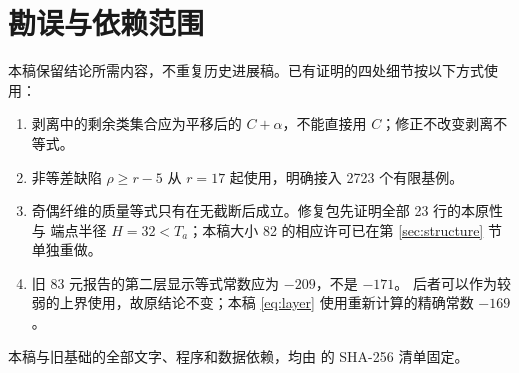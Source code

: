 \documentclass[11pt,a4paper]{article}
\begin{document}
\section*{勘误与依赖范围}
本稿保留结论所需内容，不重复历史进展稿。已有证明的四处细节按以下方式使用：
\begin{enumerate}
\item 剥离中的剩余类集合应为平移后的 $C+\alpha$，不能直接用 $C$；修正不改变剥离不等式。
\item 非等差缺陷 $\rho\ge r-5$ 从 $r=17$ 起使用，明确接入 2723 个有限基例。
\item 奇偶纤维的质量等式只有在无截断后成立。修复包先证明全部 23 行的本原性与
端点半径 $H=32<T_a$；本稿大小 82 的相应许可已在第 \ref{sec:structure} 节单独重做。
\item 旧 83 元报告的第二层显示等式常数应为 $-209$，不是 $-171$。
后者可以作为较弱的上界使用，故原结论不变；本稿 \eqref{eq:layer} 使用重新计算的精确常数 $-169$。
\end{enumerate}

本稿与旧基础的全部文字、程序和数据依赖，均由  的 SHA-256 清单固定。
\end{document}
